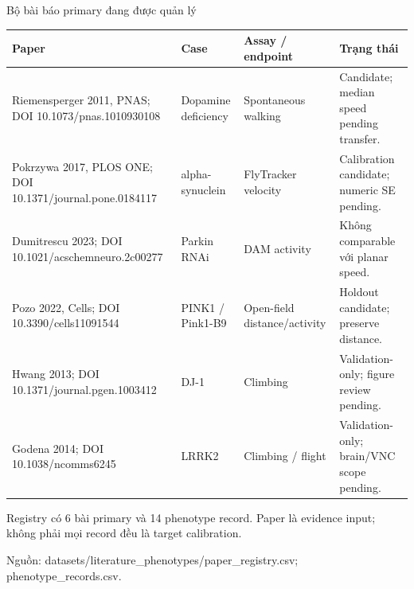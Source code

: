 \documentclass[10pt,aspectratio=169]{beamer}
\newcommand{\source}[1]{\par\vfill{\fontsize{6.0}{7}\selectfont\color{gray}Nguồn: #1\par}}
\newcommand{\smallgap}{\vspace{0.18cm}}
\begin{document}
\begin{frame}{Bộ bài báo primary đang được quản lý}
\renewcommand{\arraystretch}{1.15}\scriptsize
\begin{tabular}{@{}L{4.5cm}L{2.1cm}L{3.3cm}L{4.4cm}@{}}
\toprule
\textbf{Paper} & \textbf{Case} & \textbf{Assay / endpoint} & \textbf{Trạng thái}\\\midrule
Riemensperger 2011, PNAS; DOI 10.1073/pnas.1010930108 & Dopamine deficiency & Spontaneous walking & Candidate; median speed pending transfer.\\
Pokrzywa 2017, PLOS ONE; DOI 10.1371/journal.pone.0184117 & alpha-synuclein & FlyTracker velocity & Calibration candidate; numeric SE pending.\\
Dumitrescu 2023; DOI 10.1021/acschemneuro.2c00277 & Parkin RNAi & DAM activity & Không comparable với planar speed.\\
Pozo 2022, Cells; DOI 10.3390/cells11091544 & PINK1 / Pink1-B9 & Open-field distance/activity & Holdout candidate; preserve distance.\\
Hwang 2013; DOI 10.1371/journal.pgen.1003412 & DJ-1 & Climbing & Validation-only; figure review pending.\\
Godena 2014; DOI 10.1038/ncomms6245 & LRRK2 & Climbing / flight & Validation-only; brain/VNC scope pending.\\\bottomrule
\end{tabular}
\normalsize\smallgap
Registry có 6 bài primary và 14 phenotype record. Paper là evidence input; không phải mọi record đều là target calibration.
\source{datasets/literature\_phenotypes/paper\_registry.csv; phenotype\_records.csv.}
\end{frame}
\end{document}
